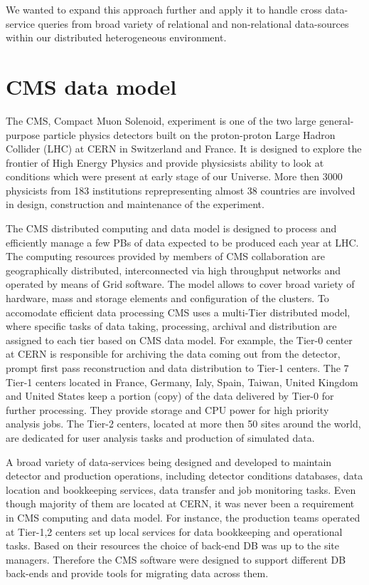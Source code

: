 \documentclass[a4paper]{jpconf}
\begin{document}
We wanted to expand this approach further and apply it 
to handle cross data-service queries from broad variety 
of relational and non-relational data-sources within 
our distributed heterogeneous environment.

\section{CMS data model\label{DataModel}}
The CMS, Compact Muon Solenoid, experiment \cite{CMS} 
is one of the two large general-purpose particle physics detectors built on 
the proton-proton Large Hadron Collider (LHC) at CERN in Switzerland and France. 
It is designed to explore the frontier of High Energy Physics and provide physicsists
ability to look at conditions which were present at early stage of our Universe.
More then 3000 physicists from 183 institutions reprepresenting almost 
38 countries are involved in design, construction and maintenance of the experiment.

The CMS distributed computing and data model \cite{CMSDataModel} 
is designed to process
and efficiently manage a few PBs of data expected to be produced each year
at LHC. The computing resources provided by members of CMS
collaboration are geographically distributed, 
interconnected via high throughput networks and operated by means 
of Grid software. The model allows to cover broad variety of
hardware, mass and storage elements and configuration of the
clusters. To accomodate efficient data processing CMS uses
a multi-Tier distributed model, where specific tasks of data taking,
processing, archival and distribution are assigned to each tier based
on CMS data model. For example, the Tier-0 center at CERN is responsible
for archiving the data coming out from the detector, prompt first pass reconstruction
and data distribution to Tier-1 centers. The 7 Tier-1 centers
located in France, Germany, Ialy, Spain, Taiwan, United Kingdom and United States
keep a portion (copy) of the data delivered by Tier-0 for further processing.
They provide storage and CPU power for high priority analysis jobs.
The Tier-2 centers, located at more then 50 sites around the world,
are dedicated for user analysis tasks and production of simulated data.

A broad variety of data-services being designed and developed to
maintain detector and production operations, including detector
conditions databases, data location and bookkeeping services,
data transfer and job monitoring tasks. Even though majority of them
are located at CERN, it was never been a requirement in CMS computing
and data model. For instance, the production teams operated at Tier-1,2
centers set up local services for data bookkeeping and operational
tasks. Based on their resources the choice of back-end DB was
up to the site managers. Therefore the CMS software were designed to support different
DB back-ends and provide tools for migrating data across them.
\end{document}
